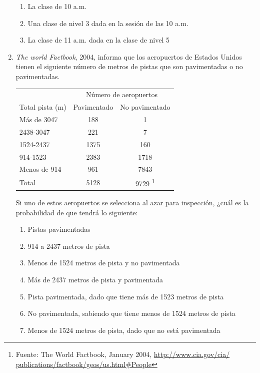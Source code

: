 \documentclass[10pt,twoside]{article}
\begin{document}
\begin{enumerate}
\begin{enumerate}
\item La clase de 10 a.m.
\item Una clase de nivel 3 dada en la sesión de las 10 a.m.
\item La clase de 11 a.m. dada en la clase de nivel 5
\end{enumerate}
\item \textit{The world Factbook}, 2004, informa que los aeropuertos de Estados Unidos tienen el siguiente número de metros de pistas que son pavimentadas o no pavimentadas.
\begin{center}
\begin{tabular}{lcc}
 & \multicolumn{2}{c}{Número de aeropuertos} \\ 
Total pista (m) & Pavimentado & No pavimentado \\\hline 
Más de 3047 & 188 & 1 \\ 
2438-3047 & 221 & 7 \\ 
1524-2437 & 1375 & 160 \\ 
914-1523 & 2383 & 1718 \\ 
Menos de 914 & 961 & 7843 \\ \hline
Total & 5128 & 9729 \footnote{Fuente: The World Factbook, January 2004, \url{http://www.cia.gov/cia/
publications/factbook/geos/us.html\#People}
}\\ 
\hline 
\end{tabular} 
\end{center}
Si uno de estos aeropuertos se selecciona al azar para inspección, ¿cuál es la probabilidad de que tendrá lo siguiente:
\begin{enumerate}
\item Pistas pavimentadas
\item 914 a 2437 metros de pista
\item Menos de 1524 metros de pista y no pavimentada
\item Más de 2437 metros de pista y pavimentada
\item Pista pavimentada, dado que tiene más de 1523 metros de pista
\item No pavimentada, sabiendo que tiene menos de 1524 metros de pista
\item Menos de 1524 metros de pista, dado que no está pavimentada
\end{enumerate}
\end{enumerate}
\end{document}
